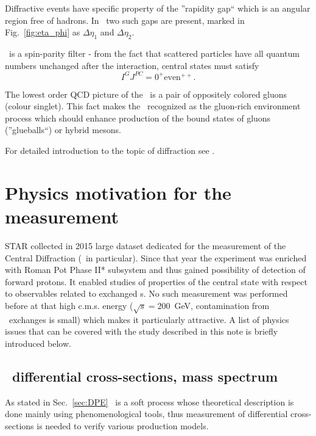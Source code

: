 Diffractive events have specific property of the ''rapidity gap`` which is an angular region free of hadrons. In \DPE\ two such gaps are present, marked in Fig.~\ref{fig:eta_phi} as $\Delta\eta_{1}$ and $\Delta\eta_{2}$.%

\DPE\ is a spin-parity filter - from the fact that scattered particles have all quantum numbers unchanged after the interaction, central states must satisfy
\begin{equation}\label{eq:DPE_IGJPC}
 I^{G}J^{PC}=0^{+}\textrm{even}^{++}.
\end{equation}%

The lowest order QCD picture of the \Pomeron\ is a pair of oppositely colored gluons (colour singlet). This fact makes the \DPE\ recognized as the gluon-rich environment process which should enhance production of the bound states of gluons (''glueballs``) or hybrid mesons.

For detailed introduction to the topic of diffraction see \cite{pomeronAndQCD,barone}.\vspace*{-20pt}

\section{Physics motivation for the measurement}
STAR collected in 2015 large dataset dedicated for the measurement of the Central Diffraction (\DPE\ in particular). Since that year the experiment was enriched with Roman Pot Phase II* subsystem and thus gained possibility of detection of forward protons. It enabled studies of properties of the central state with respect to observables related to exchanged \Pomeron s. No such measurement was performed before at that high c.m.s. energy ($\sqrt{s}=200$~GeV, contamination from \Reggeon\ exchanges is small) which makes it particularly attractive. A list of physics issues that can be covered with the study described in this note is briefly introduced below.%
%
\subsection{\DPE\ differential cross-sections, mass spectrum}

As stated in Sec.~\ref{sec:DPE} \DPE\ is a soft process whose theoretical description is done mainly using phenomenological tools, thus measurement of differential cross-sections is needed to verify various production models.

